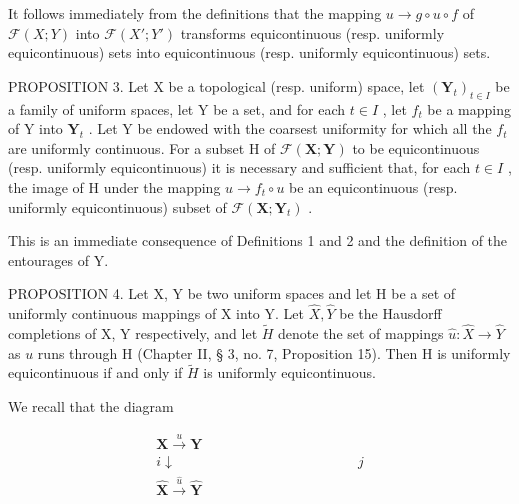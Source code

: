 It follows immediately from the definitions that the mapping \(u \rightarrow g \circ u \circ f\) of \(\mathcal{F}(X; Y)\) into \(\mathcal{F}(X'; Y')\) transforms equicontinuous (resp. uniformly equicontinuous) sets into equicontinuous (resp. uniformly equicontinuous) sets.

PROPOSITION 3. Let X be a topological (resp. uniform) space, let \((\mathbf{Y}_{t})_{t \in I}\) be a family of uniform spaces, let Y be a set, and for each \(t \in I\) , let \(f_{t}\) be a mapping of Y into \(\mathbf{Y}_{t}\) . Let Y be endowed with the coarsest uniformity for which all the \(f_{t}\) are uniformly continuous. For a subset H of \(\mathcal{F}(\mathbf{X}; \mathbf{Y})\) to be equicontinuous (resp. uniformly equicontinuous) it is necessary and sufficient that, for each \(t \in I\) , the image of H under the mapping \(u \to f_{t} \circ u\) be an equicontinuous (resp. uniformly equicontinuous) subset of \(\mathcal{F}(\mathbf{X}; \mathbf{Y}_{t})\) .

This is an immediate consequence of Definitions 1 and 2 and the definition of the entourages of Y.

PROPOSITION 4. Let X, Y be two uniform spaces and let H be a set of uniformly continuous mappings of X into Y. Let \(\hat{X}, \hat{Y}\) be the Hausdorff completions of X, Y respectively, and let \(\tilde{H}\) denote the set of mappings \(\hat{u}: \hat{X} \to \hat{Y}\) as \(u\) runs through H (Chapter II, § 3, no. 7, Proposition 15). Then H is uniformly equicontinuous if and only if \(\tilde{H}\) is uniformly equicontinuous.

We recall that the diagram

\[
\begin{array}{c} \mathbf {X} \xrightarrow {u} \mathbf {Y} \\ i \downarrow \quad \quad \quad \quad \quad \quad \quad \quad \quad \quad \quad \quad \quad j \\ \hat {\mathbf {X}} \xrightarrow {\hat {u}} \hat {\mathbf {Y}} \end{array}\tag{1}
\]

